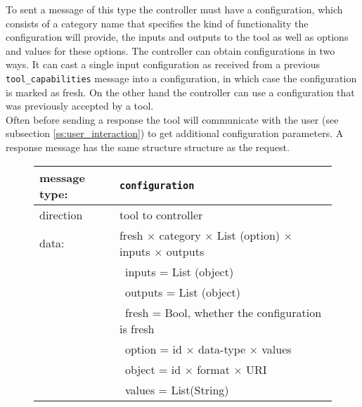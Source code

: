 \documentclass{article}
\newcommand{\msg}[1]{\texttt{#1}}
\begin{document}
   \noindent To sent a message of this type the controller must have a
   configuration, which consists of a category name that specifies the kind of
   functionality the configuration will provide, the inputs and outputs to the
   tool as well as options and values for these options. The controller can
   obtain configurations in two ways. It can cast a single input configuration as
   received from a previous \msg{tool\_capabilities} message into a
   configuration, in which case the configuration is marked as fresh. On the
   other hand the controller can use a configuration that was previously
   accepted by a tool.
   \\[4pt]
   Often before sending a response the tool will communicate with the user (see
   subsection \ref{ss:user_interaction}) to get additional configuration
   parameters. A response message has the same structure structure as the request. 

   \begin{figure}[H]
    \begin{center}
     \begin{tabular}{|ll|}
      \hline
       message type:   & \msg{configuration} \\
      \hline
       direction       & tool to controller \\
       data:           & fresh $\times$ category $\times$ List (option) $\times$ inputs $\times$ outputs \\
                       & \ inputs  = List (object) \\
                       & \ outputs = List (object) \\
                       & \ fresh   = Bool, whether the configuration is fresh \\
                       & \ option  = id $\times$ data-type $\times$ values \\
                       & \ object  = id $\times$ format $\times$ URI \\
                       & \ values  = List(String) \\
      \hline
     \end{tabular}
    \end{center}
   \end{figure}
\end{document}
